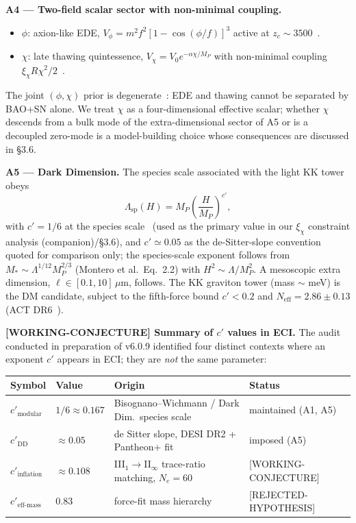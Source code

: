\documentclass[reprint,amsmath,amssymb,aps,prd,superscriptaddress]{revtex4-2}
\providecommand{\1}{\mathbf{1}}
\begin{document}
\smallskip
\noindent\textbf{A4 --- Two-field scalar sector with non-minimal coupling.}
\begin{itemize}
\item $\phi$: axion-like EDE, $V_\phi = m^2 f^2 [1-\cos(\phi/f)]^3$ active at $z_c \sim 3500$~\cite{Poulin2019}.
\item $\chi$: late thawing quintessence, $V_\chi = V_0 e^{-\alpha \chi / M_P}$ with non-minimal coupling $\xi_\chi R \chi^2 / 2$~\cite{Ye2025,Wolf2025,PanYe2026}.
\end{itemize}
The joint $(\phi,\chi)$ prior is degenerate~\cite{WangPiao2025}: EDE and thawing cannot be separated by BAO+SN alone. We treat $\chi$ as a four-dimensional effective scalar; whether $\chi$ descends from a bulk mode of the extra-dimensional sector of A5 or is a decoupled zero-mode is a model-building choice whose consequences are discussed in \S3.6.

\smallskip
\noindent\textbf{A5 --- Dark Dimension.}
The species scale associated with the light KK tower obeys
\begin{equation}
\Lambda_{\mathrm{sp}}(H) = M_P \left( \frac{H}{M_P} \right)^{c'},
\label{eq:speciesH}
\end{equation}
with $c' = 1/6$ at the species scale~\cite{Montero2022,AAL2023} (used as the primary value in our $\xi_\chi$ constraint analysis (companion)/\S3.6), and $c' \simeq 0.05$ as the de-Sitter-slope convention~\cite{AAL2025,OoguriVafa2007,Bedroya2025} quoted for comparison only; the species-scale exponent follows from $M_* \sim \Lambda^{1/12} M_P^{2/3}$ (Montero et al.\ Eq.~2.2) with $H^2 \sim \Lambda / M_P^2$.
A mesoscopic extra dimension, $\ell \in [0.1, 10] \, \mu\mathrm{m}$, follows. The KK graviton tower (mass $\sim$ meV) is the DM candidate, subject to the fifth-force bound $c' < 0.2$ and $N_{\mathrm{eff}} = 2.86 \pm 0.13$ (ACT DR6~\cite{Calabrese2025}).

\medskip
\noindent\textbf{[WORKING-CONJECTURE] Summary of $c'$ values in ECI.}\label{sec:cprime-summary}
The audit conducted in preparation of v6.0.9 identified four distinct contexts where an exponent $c'$ appears in ECI; they are \emph{not} the same parameter:

\begin{center}
\begin{tabular}{@{}llll@{}}
\hline
Symbol & Value & Origin & Status \\
\hline
$c'_{\mathrm{modular}}$ & $1/6 \approx 0.167$ & Bisognano--Wichmann / Dark Dim.\ species scale & maintained (A1, A5) \\
$c'_{\mathrm{DD}}$ & $\approx 0.05$ & de Sitter slope, DESI DR2 + Pantheon+ fit~\cite{Bedroya2025} & imposed (A5) \\
$c'_{\mathrm{inflation}}$ & $\approx 0.108$ & III$_1\!\to$II$_\infty$ trace-ratio matching, $N_e=60$ & [WORKING-CONJECTURE] \\
$c'_{\mathrm{eff\text{-}mass}}$ & $0.83$ & force-fit mass hierarchy & [REJECTED-HYPOTHESIS] \\
\hline
\end{tabular}
\end{center}
\end{document}
